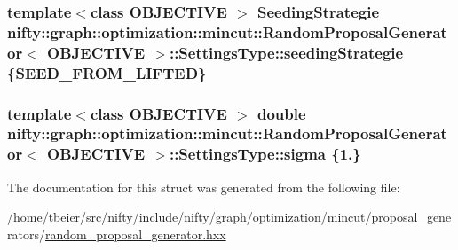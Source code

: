 \subsubsection[{seeding\+Strategie}]{\setlength{\rightskip}{0pt plus 5cm}template$<$class O\+B\+J\+E\+C\+T\+I\+V\+E $>$ {\bf Seeding\+Strategie} {\bf nifty\+::graph\+::optimization\+::mincut\+::\+Random\+Proposal\+Generator}$<$ O\+B\+J\+E\+C\+T\+I\+V\+E $>$\+::Settings\+Type\+::seeding\+Strategie \{{\bf S\+E\+E\+D\+\_\+\+F\+R\+O\+M\+\_\+\+L\+I\+F\+T\+E\+D}\}}\label{structnifty_1_1graph_1_1optimization_1_1mincut_1_1RandomProposalGenerator_1_1SettingsType_a4443bd008535e0cba6007e9b6a83b7b1}
\hypertarget{structnifty_1_1graph_1_1optimization_1_1mincut_1_1RandomProposalGenerator_1_1SettingsType_aef6943f555bbb26f02b0e361b39c5480}{}
\subsubsection[{sigma}]{\setlength{\rightskip}{0pt plus 5cm}template$<$class O\+B\+J\+E\+C\+T\+I\+V\+E $>$ double {\bf nifty\+::graph\+::optimization\+::mincut\+::\+Random\+Proposal\+Generator}$<$ O\+B\+J\+E\+C\+T\+I\+V\+E $>$\+::Settings\+Type\+::sigma \{1.\}}\label{structnifty_1_1graph_1_1optimization_1_1mincut_1_1RandomProposalGenerator_1_1SettingsType_aef6943f555bbb26f02b0e361b39c5480}


The documentation for this struct was generated from the following file\+:\begin{DoxyCompactItemize}
\item 
/home/tbeier/src/nifty/include/nifty/graph/optimization/mincut/proposal\+\_\+generators/\hyperlink{random__proposal__generator_8hxx}{random\+\_\+proposal\+\_\+generator.\+hxx}\end{DoxyCompactItemize}
